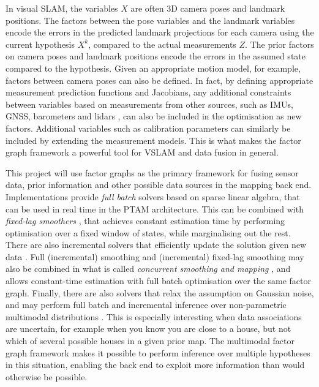 In visual SLAM, the variables $X$ are often 3D camera poses and landmark positions.
The factors between the pose variables and the landmark variables encode the errors in the predicted landmark projections for each camera using the current hypothesis $X^k$, compared to the actual measurements $Z$.
The prior factors on camera poses and landmark positions encode the errors in the assumed state compared to the hypothesis.
Given an appropriate motion model, for example, factors between camera poses can also be defined.
In fact, by defining appropriate measurement prediction functions and Jacobians, any additional constraints between variables based on measurements from other sources, such as IMUs, GNSS, barometers and lidars \cite{Chiu2014}, can also be included in the optimisation as new factors.
Additional variables such as calibration parameters can similarly be included by extending the measurement models.
This is what makes the factor graph framework a powerful tool for VSLAM and data fusion in general.

This project will use factor graphs as the primary framework for fusing sensor data, prior information and other possible data sources in the mapping back end. 
Implementations \cite{Kummerle2011G2o:Optimization, KuemmerleG2oSource, Dellaert2012FactorIntroduction, Dellaert2018GTSAMSource} provide \textit{full batch} solvers based on sparse linear algebra, that can be used in real time in the PTAM architecture.
This can be combined with \textit{fixed-lag smoothers} \cite{Strasdat2011DoubleSLAM, Chiu2013}, that achieves constant estimation time by performing optimisation over a fixed window of states, while marginalising out the rest.
There are also incremental solvers that efficiently update the solution given new data \cite{Kaess2012ISAM2:Tree}.
Full (incremental) smoothing and (incremental) fixed-lag smoothing may also be combined in what is called \textit{concurrent smoothing and mapping} \cite{Kaess2012, Chiu2013}, and allows constant-time estimation with full batch optimisation over the same factor graph.
Finally, there are also solvers that relax the assumption on Gaussian noise, and may perform full batch and incremental inference over non-parametric multimodal distributions \cite{Fourie2016, Fourie2017Multi-modalGraphs, incrementalinferencejl}. 
This is especially interesting when data associations are uncertain, for example when you know you are close to a house, but not which of several possible houses in a given prior map.
The multimodal factor graph framework makes it possible to perform inference over multiple hypotheses in this situation, enabling the back end to exploit more information than would otherwise be possible.


